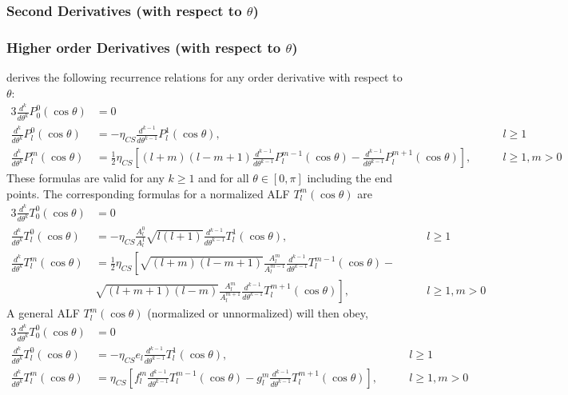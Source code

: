 \documentclass[12pt]{article}
\begin{document}
\subsubsection{Second Derivatives (with respect to $\theta$)}

\subsubsection{Higher order Derivatives (with respect to $\theta$)}

\citet{bosch2000} derives the following recurrence relations for any order
derivative with respect to $\theta$:
\begin{alignat}{3}
\frac{d^k}{d\theta^k} P_0^0(\cos{\theta}) &= 0 & \\
\frac{d^k}{d\theta^k} P_l^0(\cos{\theta}) &= -\eta_{CS} \frac{d^{k-1}}{d\theta^{k-1}} P_l^1(\cos{\theta}), & \qquad l \geq 1 \\
\frac{d^k}{d\theta^k} P_l^m(\cos{\theta}) &= \frac{1}{2} \eta_{CS} \left[ (l+m)(l-m+1) \frac{d^{k-1}}{d\theta^{k-1}} P_l^{m-1}(\cos{\theta}) - \frac{d^{k-1}}{d\theta^{k-1}} P_l^{m+1}(\cos{\theta}) \right], & \qquad l \geq 1, m > 0
\end{alignat}
These formulas are valid for any $k \geq 1$ and for all $\theta \in [0,\pi]$ including the end points.
The corresponding formulas for a normalized ALF $T_l^m(\cos{\theta})$ are
\begin{alignat}{3}
\frac{d^k}{d\theta^k} T_0^0(\cos{\theta}) &= 0 \\
\frac{d^k}{d\theta^k} T_l^0(\cos{\theta}) &= -\eta_{CS} \frac{A_l^0}{A_l^1} \sqrt{l(l+1)} \frac{d^{k-1}}{d\theta^{k-1}} T_l^1(\cos{\theta}), & \qquad l \geq 1 \label{eqn:DR2} \\
\frac{d^k}{d\theta^k} T_l^m(\cos{\theta}) &= \frac{1}{2} \eta_{CS}
\left[
\sqrt{(l+m)(l-m+1)} \frac{A_l^m}{A_l^{m-1}} \frac{d^{k-1}}{d\theta^{k-1}} T_l^{m-1}(\cos{\theta}) - \right. \nonumber \\
&
\left.
\sqrt{(l+m+1)(l-m)} \frac{A_l^m}{A_l^{m+1}} \frac{d^{k-1}}{d\theta^{k-1}} T_l^{m+1}(\cos{\theta})
\right], & \qquad l \geq 1, m > 0 \label{eqn:DR3}
\end{alignat}
A general ALF $T_l^m(\cos{\theta})$ (normalized or unnormalized) will then obey,
\begin{alignat}{3}
\frac{d^k}{d\theta^k} T_0^0(\cos{\theta}) &= 0 \\
\frac{d^k}{d\theta^k} T_l^0(\cos{\theta}) &= -\eta_{CS} e_l \frac{d^{k-1}}{d\theta^{k-1}} T_l^1(\cos{\theta}), & \qquad l \geq 1 \\
\frac{d^k}{d\theta^k} T_l^m(\cos{\theta}) &= \eta_{CS} \left[ f_l^m \frac{d^{k-1}}{d\theta^{k-1}} T_l^{m-1}(\cos{\theta}) - g_l^m \frac{d^{k-1}}{d\theta^{k-1}} T_l^{m+1}(\cos{\theta}) \right], & \qquad l \geq 1, m > 0
\end{alignat}
\end{document}
